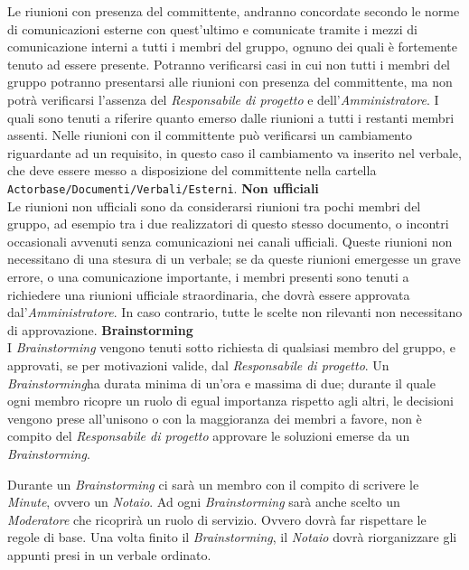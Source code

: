 \documentclass[a4paper]{article}
\begin{document}
		Le riunioni con presenza del committente, andranno concordate secondo le norme di comunicazioni esterne con quest'ultimo
		e comunicate tramite i mezzi di comunicazione interni a tutti i membri del gruppo, ognuno dei quali è fortemente tenuto ad
		essere presente. Potranno verificarsi casi in cui non tutti i membri del gruppo potranno presentarsi alle riunioni con
		presenza del committente, ma non potrà verificarsi l'assenza del \emph{Responsabile di progetto} e dell'\emph{Amministratore}.
		I quali sono tenuti a riferire quanto emerso dalle riunioni a tutti i restanti membri assenti. Nelle riunioni con il
		committente può verificarsi un cambiamento riguardante ad un requisito, in questo caso il cambiamento va inserito nel
		verbale, che deve essere messo a disposizione del committente nella cartella \verb|Actorbase/Documenti/Verbali/Esterni|.
		\textbf{Non ufficiali} \\
		Le riunioni non ufficiali sono da considerarsi riunioni tra pochi membri del gruppo, ad esempio tra i due realizzatori di questo
		stesso documento, o incontri occasionali avvenuti senza comunicazioni nei canali ufficiali. Queste riunioni non necessitano di
		una stesura di un verbale; se da queste riunioni emergesse un grave errore, o una comunicazione importante, i membri presenti
		sono tenuti a richiedere una riunioni ufficiale straordinaria, che dovrà essere approvata dal'\emph{Amministratore}. In caso
		contrario, tutte le scelte non rilevanti non necessitano di approvazione.
		\textbf{Brainstorming} \\
		I \emph{Brainstorming} vengono tenuti sotto richiesta di qualsiasi membro del gruppo, e approvati, se per motivazioni
		valide, dal \emph{Responsabile di progetto}. Un \emph{Brainstorming}ha durata minima di un'ora e massima di due; durante il quale
		ogni membro ricopre un ruolo di egual importanza rispetto agli altri, le decisioni vengono prese all'unisono o con la maggioranza
		dei membri a favore, non è compito del \emph{Responsabile di progetto} approvare le soluzioni emerse da un \emph{Brainstorming}.

		Durante un \emph{Brainstorming} ci sarà un membro con il compito di scrivere le \emph{Minute}, ovvero un \emph{Notaio}.
		Ad ogni \emph{Brainstorming} sarà anche scelto un \emph{Moderatore} che ricoprirà un ruolo di servizio. Ovvero dovrà far
		rispettare le regole di base. Una volta finito il \emph{Brainstorming}, il \emph{Notaio} dovrà riorganizzare gli appunti
		presi in un verbale ordinato.

	\cleardoublepage
	\listoffigures

	\cleardoublepage
	\listoftables
\end{document}

